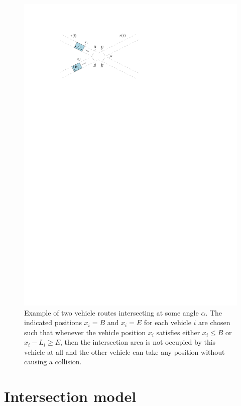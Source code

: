 \documentclass[a4paper]{report}
\theoremstyle{definition}
\theoremstyle{plain}
\begin{document}
\begin{figure}
  \centering
  \includegraphics[scale=1]{figures/intersection-non-axis-aligned-annotated}
  \caption{Example of two vehicle routes intersecting at some angle $\alpha$. The
    indicated positions $x_{i} = B$ and $x_{i} = E$ for each vehicle $i$ are
    chosen such that whenever the vehicle position $x_{i}$ satisfies either
    $x_{i} \leq B$ or $x_{i} - L_{i} \geq E$, then the intersection area is not
    occupied by this vehicle at all and the other vehicle can take any position
    without causing a collision.}%
  \label{fig:intersection-non-axis-aligned}
\end{figure}


\section{Intersection model}
\end{document}
